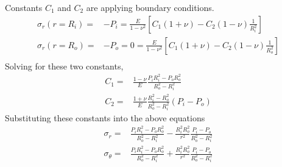 \documentclass[11pt]{article} %
\begin{document}
Constants $C_1$ and $C_2$ are applying boundary conditions.
\begin{equation}\nonumber
\begin{aligned}
\sigma_r(r=R_i) = &-P_i= \frac{E}{1-\nu^2}\left[C_1(1+\nu)-C_2(1-\nu)\frac{1}{R_i^2}\right]\\
\sigma_r(r=R_o) = &-P_o=0=\frac{E}{1-\nu^2}\left[C_1(1+\nu)-C_2(1-\nu)\frac{1}{R_o^2}\right]\\
\end{aligned}
\end{equation}
Solving for these two constants,
\begin{equation}\nonumber
\begin{aligned}
C_1=&\frac{1-\nu}{E}\frac{P_iR_i^2-P_oR_o^2}{R_o^2-R_i^2}\\
C_2=&\frac{1+\nu}{E}\frac{R_i^2-R_o^2}{R_o^2-R_i^2}\left(P_i-P_o\right)
\end{aligned}
\end{equation}
Substituting these constants into the above equations
\begin{equation}\label{eqs04}
\begin{aligned}
\sigma_{r}=&\frac{P_i R_i^{2}-P_o R_o^{2}}{R_o^{2}-R_i^{2}}-\frac{R_i^{2} R_o^{2}}{r^{2}} \frac{P_i-P_o}{R_o^{2}-R_i^{2}}\\
\sigma_{\theta}=&\frac{P_i R_i^{2}-P_o R_o^{2}}{R_o^{2}-R_i^{2}}+\frac{R_i^{2} R_o^{2}}{r^{2}} \frac{P_i-P_o}{R_o^{2}-R_i^{2}}
\end{aligned}
\end{equation}
\end{document}
